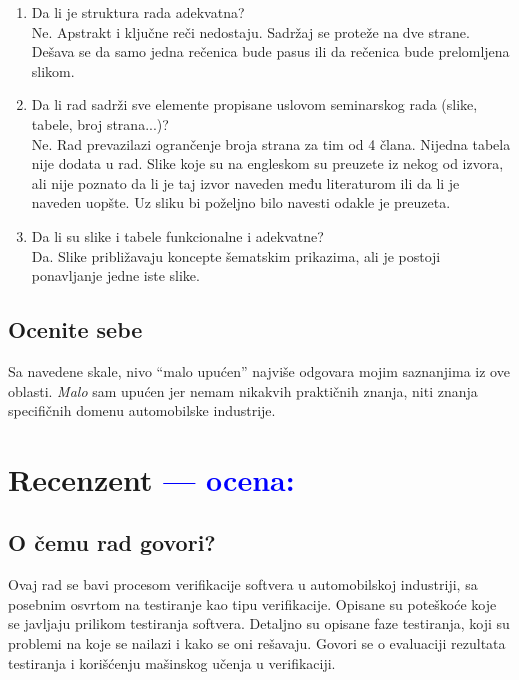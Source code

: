 \documentclass[a4paper]{report}
\newcommand{\odgovor}[1]{\textcolor{blue}{#1}}
\begin{document}
\begin{enumerate}
 \item Da li je struktura rada adekvatna?\\
   Ne. Apstrakt i ključne reči nedostaju. Sadržaj se proteže na dve strane. Dešava se da samo jedna rečenica bude pasus ili da rečenica bude prelomljena slikom.
 \item Da li rad sadrži sve elemente propisane uslovom seminarskog rada (slike, tabele, broj strana...)?\\
   Ne. Rad prevazilazi ogrančenje broja strana za tim od 4 člana. Nijedna tabela nije dodata u rad. Slike koje su na engleskom su preuzete iz nekog od izvora, ali nije poznato da li je taj izvor naveden među literaturom ili da li je naveden uopšte. Uz sliku bi poželjno bilo navesti odakle je preuzeta.
 \item Da li su slike i tabele funkcionalne i adekvatne?\\
   Da. Slike približavaju koncepte šematskim prikazima, ali je postoji ponavljanje jedne iste slike.
\end{enumerate}

\section{Ocenite sebe}

Sa navedene skale, nivo ``malo upućen'' najviše odgovara mojim saznanjima iz ove oblasti. {\em{Malo}} sam upućen jer nemam nikakvih praktičnih znanja, niti znanja specifičnih domenu automobilske industrije.

\chapter{Recenzent \odgovor{--- ocena:} }


\section{O čemu rad govori?}
Ovaj rad se bavi procesom verifikacije softvera u automobilskoj industriji, sa posebnim osvrtom na testiranje kao tipu verifikacije. Opisane su poteškoće koje se javljaju prilikom testiranja softvera. Detaljno su opisane faze testiranja, koji su problemi na koje se nailazi i kako se oni rešavaju. Govori se o evaluaciji rezultata testiranja i korišćenju mašinskog učenja u verifikaciji.
\end{document}
